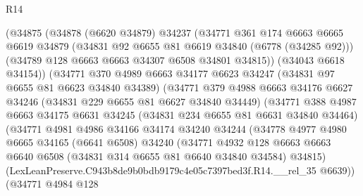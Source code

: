 \begin{lexlean}{R14}
\begin{coremodule}
                    (@34875
                      (@34878
                        (@6620 @34879)
                        @34237
                        (@34771
                          @361
                          @174
                          @6663
                          @6665
                          @6619
                          @34879
                          (@34831 @92 @6655 @81 @6619 @34840 (@6778 (@34285 @92)))
                          (@34789 @128 @6663 @6663 @34307 @6508 @34801 @34815))
                        (@34043 @6618 @34154))
                      (@34771
                        @370
                        @4989
                        @6663
                        @34177
                        @6623
                        @34247
                        (@34831 @97 @6655 @81 @6623 @34840 @34389)
                        (@34771
                          @379
                          @4988
                          @6663
                          @34176
                          @6627
                          @34246
                          (@34831 @229 @6655 @81 @6627 @34840 @34449)
                          (@34771
                            @388
                            @4987
                            @6663
                            @34175
                            @6631
                            @34245
                            (@34831 @234 @6655 @81 @6631 @34840 @34464)
                            (@34771
                              @4981
                              @4986
                              @34166
                              @34174
                              @34240
                              @34244
                              (@34778
                                @4977
                                @4980
                                @6665
                                @34165
                                (@6641 @6508)
                                @34240
                                (@34771
                                  @4932
                                  @128
                                  @6663
                                  @6663
                                  @6640
                                  @6508
                                  (@34831 @314 @6655 @81 @6640 @34840 @34584)
                                  @34815)
                                (LexLeanPreserve.C943b8de9b0bdb9179c4e05c7397bed3f.R14.__rel_35
                                  @6639))
                              (@34771
                                @4984
                                @128

\end{coremodule}
\end{lexlean}
